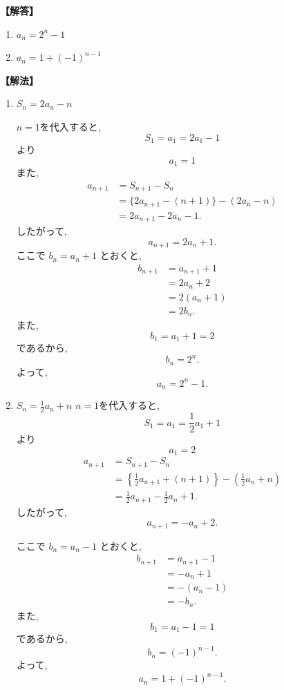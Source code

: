\noindent\textbf{【解答】}
\begin{enumerate}[label=(\arabic*),parsep=3pt]
  \item $\displaystyle a_n=2^n-1$
  \item $\displaystyle a_n=1+(-1)^{n-1}$
\end{enumerate}

\noindent\textbf{【解法】}
\begin{enumerate}[label=(\arabic*),parsep=3pt]
  \item $\displaystyle S_n=2a_n-n$

        $n=1$を代入すると,
        \[
          S_1=a_1=2a_1-1
        \]
        より
        \[
          a_1=1
        \]
        また,
        \begin{align*}
          a_{n+1}
           & =S_{n+1}-S_n                 \\
           & =\{2a_{n+1}-(n+1)\}-(2a_n-n) \\
           & =2a_{n+1}-2a_n-1.
        \end{align*}
        したがって,
        \[
          a_{n+1}=2a_n+1.
        \]
        ここで $b_n=a_n+1$ とおくと,
        \begin{align*}
          b_{n+1}
           & =a_{n+1}+1 \\
           & =2a_n+2    \\
           & =2(a_n+1)  \\
           & =2b_n.
        \end{align*}
        また,
        \[
          b_1=a_1+1=2
        \]
        であるから,
        \[
          b_n=2^n.
        \]
        よって,
        \[
          a_n=2^n-1.
        \]
  \item $\displaystyle S_n=\frac12a_n+n$
        $n=1$を代入すると,
        \[
          S_1=a_1=\frac12a_1+1
        \]
        より
        \[
          a_1=2
        \]
        \begin{align*}
          a_{n+1}
           & =S_{n+1}-S_n                         \\
           & =\left\{\frac12a_{n+1}+(n+1)\right\}-\left(\frac12a_n+n\right)\\
           & =\frac12a_{n+1}-\frac12a_n+1.
        \end{align*}
        したがって,
        \[
          a_{n+1}=-a_n+2.
        \]

        ここで $b_n=a_n-1$ とおくと,
        \begin{align*}
          b_{n+1}
           & =a_{n+1}-1 \\
           & =-a_n+1    \\
           & =-(a_n-1)  \\
           & =-b_n.
        \end{align*}
        また,
        \[
          b_1=a_1-1=1
        \]
        であるから,
        \[
          b_n=(-1)^{n-1}.
        \]
        よって,
        \[
          a_n=1+(-1)^{n-1}.
        \]

\end{enumerate}

